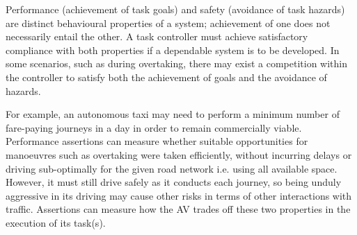 Performance (achievement of task goals) and safety (avoidance of task hazards) are distinct behavioural properties of a system; achievement of one does not necessarily entail the other. A task controller must achieve satisfactory compliance with both properties if a dependable system is to be developed. In some scenarios, such as during overtaking, there may exist a competition within the controller to satisfy both the achievement of goals and the avoidance of hazards. 

For example, an autonomous taxi may need to perform a minimum number of fare-paying journeys in a day in order to remain commercially viable. Performance assertions can measure whether suitable opportunities for manoeuvres such as overtaking were taken efficiently, without incurring delays or driving sub-optimally for the given road network i.e. using all available space. However, it must still drive safely as it conducts each journey, so being unduly aggressive in its driving may cause other risks in terms of other interactions with traffic. Assertions can measure how the AV trades off these two properties in the execution of its task(s). 



